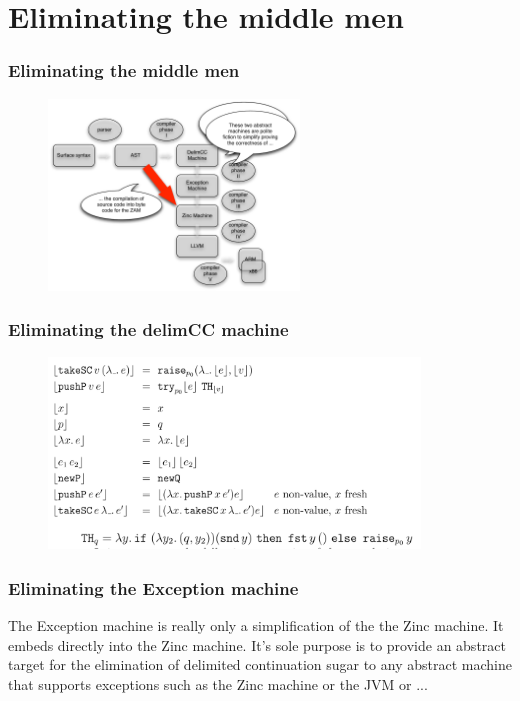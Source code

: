 \documentclass{beamer}
\begin{document}
  \section{Eliminating the middle men}
  \begin{frame}
    \frametitle{Eliminating the middle men}
    \begin{figure}[ht]
      \begin{center}        
        \includegraphics[height=2in]{pipelinefigures/PoliteFictions.pdf}
      \end{center}      
    \end{figure}

  \end{frame}
  \begin{frame}
    \frametitle{Eliminating the delimCC machine}
    \begin{figure}[ht]
      \begin{center}        
        \includegraphics[height=2in]{pipelinefigures/EliminatingDelimCCMachine.pdf}
      \end{center}      
    \end{figure}

  \end{frame}
  \begin{frame}
    \frametitle{Eliminating the Exception machine} The Exception
    machine is really only a simplification of the the Zinc
    machine. It embeds directly into the Zinc machine. It's sole
    purpose is to provide an abstract target for the elimination of
    delimited continuation sugar to any abstract machine that supports
    exceptions such as the Zinc machine or the JVM or ...
  \end{frame}
\end{document}
